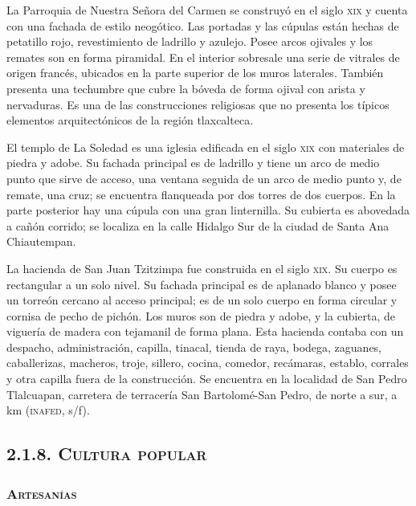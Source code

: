 \documentclass[14pt,letterpaper,twoside]{extbook} %
\begin{document}
La Parroquia de Nuestra Señora del Carmen se construyó en el siglo \textsc{xix} y cuenta con una fachada de estilo neogótico. Las portadas y las cúpulas están hechas de petatillo rojo, revestimiento de ladrillo y azulejo. Posee arcos ojivales y los remates son en forma piramidal. En el interior sobresale una serie de vitrales de origen francés, ubicados en la parte superior de los muros laterales. También presenta una techumbre que cubre la bóveda de forma ojival con arista y nervaduras. Es una de las construcciones religiosas que no presenta los típicos elementos arquitectónicos de la región tlaxcalteca.

El templo de La Soledad es una iglesia edificada en el siglo \textsc{xix} con materiales de piedra y adobe. Su fachada principal es de ladrillo y tiene un arco de medio punto que sirve de acceso, una ventana seguida de un arco de medio punto y, de remate, una cruz; se encuentra flanqueada por dos torres de dos cuerpos. En la parte posterior hay una cúpula con una gran linternilla. Su cubierta es abovedada a cañón corrido; se localiza en la calle Hidalgo Sur  de la ciudad de Santa Ana Chiautempan.

La hacienda de San Juan Tzitzimpa fue construida en el siglo \textsc{xix}. Su cuerpo es rectangular a un solo nivel. Su fachada principal es de aplanado blanco y posee un torreón cercano al acceso principal; es de un solo cuerpo en forma circular y cornisa de pecho de pichón. Los
muros son de piedra y adobe, y la cubierta, de viguería de madera con tejamanil de forma plana. Esta hacienda contaba con un despacho, administración, capilla, tinacal, tienda de raya, bodega, zaguanes, caballerizas, macheros, troje, sillero, cocina, comedor, recámaras, establo, corrales y otra capilla fuera de la construcción. Se encuentra en la localidad de San Pedro Tlalcuapan, carretera de terracería San Bartolomé-San Pedro, de norte a sur, a \thinspace km (\textsc{inafed}, s/f).

\subsection*{\mdseries\large\textsc{2.1.8. Cultura popular}}

\subsubsection{\mdseries\large\textsc{Artesanías}}
\end{document}
